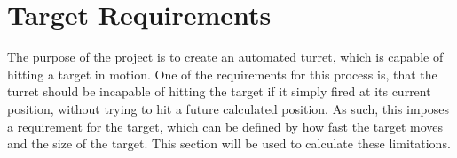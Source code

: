 \section{Target Requirements}\label{TargetReq}
The purpose of the project is to create an automated turret, which is capable of
hitting a target in motion. One of the requirements for this process is, that
the turret should be incapable of hitting the target if it simply fired at its
current position, without trying to hit a future calculated position. As such,
this imposes a requirement for the target, which can be defined by how fast the
target moves and the size of the target. This section will be used to calculate
these limitations.
